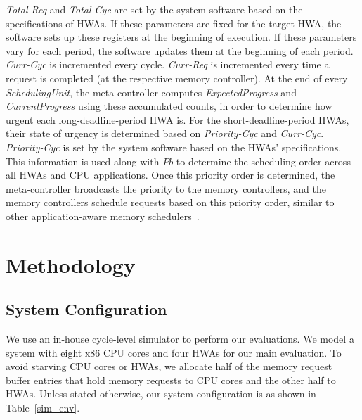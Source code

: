 \documentclass[10pt,letterpaper]{article}
\begin{document}
{\it Total-Req} and {\it Total-Cyc} are set by the system software based on the
specifications of HWAs. If these parameters are fixed for the target HWA, the
software sets up these registers at the beginning of execution. If these
parameters vary for each period, the software
updates them at the beginning of each period. {\it Curr-Cyc} is incremented
every cycle. {\it Curr-Req} is incremented every time a request is completed (at
the respective memory controller). At the end of every {\it SchedulingUnit}, the
meta controller computes {\it ExpectedProgress} and {\it CurrentProgress} using
these accumulated counts, in order to determine how urgent each
long-deadline-period HWA is. For the short-deadline-period HWAs, their state of
urgency is determined based on {\it Priority-Cyc} and {\it Curr-Cyc}. {\it
Priority-Cyc} is set by the system software based on the HWAs' specifications.
This information is used along with $Pb$ to determine the scheduling order
across all HWAs and CPU applications. Once this priority order is determined,
the meta-controller broadcasts the priority to the memory controllers, and the
memory controllers schedule requests based on this priority order, similar to
other application-aware memory schedulers~\cite{stfm,parbs,atlas,tcm}.

 \newcommand{\aloneipc}{\textrm{IPC}_{i}^{\scriptstyle{alone}}}
\newcommand{\sharedipc}{\textrm{IPC}_{i}^{\scriptstyle{shared}}}

\section{Methodology}
\label{sec:methodology}
\subsection{System Configuration}
We use an in-house cycle-level simulator to perform our evaluations. We model a
system with eight x86 CPU cores and four HWAs for our main evaluation. 
To avoid starving CPU cores or
HWAs, we allocate half of the memory request buffer entries that hold memory
requests to CPU cores and the other half to HWAs. Unless stated
otherwise, our system configuration is as shown in Table~\ref{sim_env}.
\end{document}
